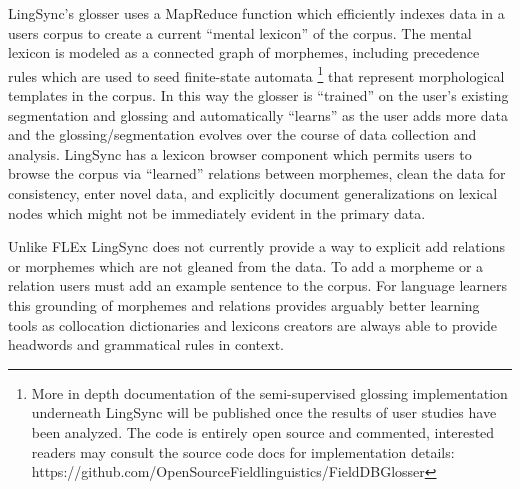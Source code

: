 \documentclass[11pt]{article}
\newcommand{\smalltodo}[2][]
    {\todo[caption={#2}, #1]
    {\tiny#2\normalsize}}
\begin{document}
LingSync's glosser  uses a MapReduce function which efficiently indexes data in
a users corpus to create a current ``mental lexicon'' of the corpus.  The
mental lexicon is modeled as a connected graph of morphemes, including
precedence rules which are used to seed finite-state automata  \cite{Cook:2009}\footnote{More in depth documentation of the semi-supervised glossing implementation underneath LingSync will be published once the results of user studies have been analyzed. The code is entirely open source and commented, interested readers may consult the source code docs for implementation details: \\
https://github.com/OpenSourceFieldlinguistics/FieldDBGlosser}
that represent morphological templates in the corpus. 
In this way the glosser is ``trained'' on the user's existing segmentation and
glossing and automatically ``learns'' as the user adds more data and the
glossing/segmentation evolves over the course of data collection and analysis. 
LingSync has a lexicon browser component which permits users to browse the
corpus via ``learned''  relations between morphemes, clean the data for
consistency, enter novel data, and explicitly document generalizations on
lexical nodes which might not be immediately evident in the primary data. 

Unlike FLEx \cite{Black:2006} LingSync does not currently provide a way to explicit add relations or morphemes which
are not gleaned from the data.  
To add a morpheme or a relation users must add an example sentence to the corpus. 
For language learners this grounding of morphemes and relations provides arguably better learning
tools as collocation dictionaries and lexicons creators are always able to
provide headwords and grammatical rules in context.%
%
\end{document}
